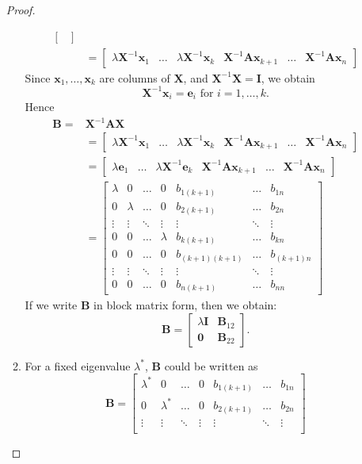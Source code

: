 \begin{enumerate}
\begin{proof}
\begin{enumerate}
\begin{align*}
\begin{bmatrix}
\end{bmatrix}\\
&=\begin{bmatrix}
\lambda\bm X^{-1}\bm x_1&\dots&\lambda\bm X^{-1}\bm x_k&\bm X^{-1}\bm A\bm x_{k+1}&\dots&\bm X^{-1}\bm A\bm x_n
\end{bmatrix}
\end{align*}
Since $\bm x_1,\dots,\bm x_k$ are columns of $\bm X$, and $\bm X^{-1}\bm X=\bm I$, we obtain
\[
\bm X^{-1}\bm x_i=\bm e_i\text{ for }i=1,\dots,k.
\] 
Hence 
\begin{align*}
\bm B=&\bm X^{-1}\bm A\bm X\\
&=\begin{bmatrix}
\lambda\bm X^{-1}\bm x_1&\dots&\lambda\bm X^{-1}\bm x_k&\bm X^{-1}\bm A\bm x_{k+1}&\dots&\bm X^{-1}\bm A\bm x_n
\end{bmatrix}\\
&=\begin{bmatrix}
\lambda\bm e_1&\dots&\lambda\bm X^{-1}\bm e_k&\bm X^{-1}\bm A\bm x_{k+1}&\dots&\bm X^{-1}\bm A\bm x_n
\end{bmatrix}\\
&=\begin{bmatrix}
\lambda&0&\dots&0&b_{1(k+1)}&\dots&b_{1n}\\
0&\lambda&\dots&0&b_{2(k+1)}&\dots&b_{2n}\\
\vdots&\vdots&\ddots&\vdots&\vdots&\ddots&\vdots\\
0&0&\dots&\lambda&b_{k(k+1)}&\dots&b_{kn}\\
0&0&\dots&0&b_{(k+1)(k+1)}&\dots&b_{(k+1)n}\\
\vdots&\vdots&\ddots&\vdots&\vdots&\ddots&\vdots\\
0&0&\dots&0&b_{n(k+1)}&\dots&b_{nn}
\end{bmatrix}
\end{align*}
If we write $\bm B$ in block matrix form, then we obtain:
\[
\bm B=\begin{bmatrix}
\lambda\bm I&\bm B_{12}\\\bm 0&\bm B_{22}
\end{bmatrix}.
\]
\item
For a fixed eigenvalue $\lambda^{*}$, $\bm B$ could be written as
\[
\bm B=\begin{bmatrix}
\lambda^{*}&0&\dots&0&b_{1(k+1)}&\dots&b_{1n}\\
0&\lambda^{*}&\dots&0&b_{2(k+1)}&\dots&b_{2n}\\
\vdots&\vdots&\ddots&\vdots&\vdots&\ddots&\vdots\\

\end{bmatrix}\]
\end{enumerate}
\end{proof}
\end{enumerate}
